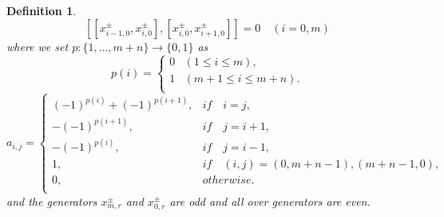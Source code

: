 \documentclass[english]{elsarticle}
\newtheorem{definition}{Definition}[section]
\numberwithin{equation}{section}
\begin{document}
\begin{definition}
\begin{equation}
\label{eq:9}
    [[x_{{i-1},0}^{\pm},x_{{i},0}^{\pm}],[x_{{i},0}^{\pm},x_{{i+1},0}^{\pm}]]=0 \quad (i=0,m)
\end{equation}
where
we set $p:\{1,\ldots ,m+n\} \rightarrow \{0,1\}$ as
\[
p(i) =
    \begin{cases}
      0 & (1\leq i\leq m), \\
      1 & (m+1\leq i\leq m+n).\\
    \end{cases}
\]
\[
a_{i,j} =
    \begin{cases}
      (-1)^{p(i)}+(-1)^{p(i+1)}, & if \quad i=j, \\
      -(-1)^{p(i+1)}, & if \quad j=i+1,\\
      -(-1)^{p(i)}, & if \quad j=i-1,\\
      1, & if \quad (i,j) = (0,m+n-1),(m+n-1,0),\\
      0, & otherwise.\\
    \end{cases}
\]
and the generators $x_{{m},r}^{\pm}$ and $x_{{0},r}^{\pm}$ are odd and all over generators are even.
\end{definition}
\end{document}
